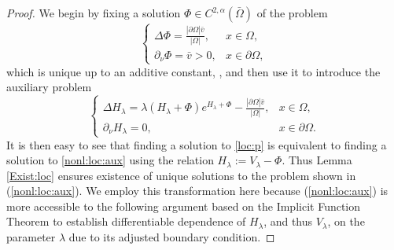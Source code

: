 \documentclass[12pt,a4paper]{amsart}
\theoremstyle{definition}
\theoremstyle{remark}
\numberwithin{equation}{section}
\numberwithin{theorem}{section}
\begin{document}
\begin{proof}
We begin by fixing a solution $\Phi \in C^{2,\alpha}(\bar{\Omega})$ of the problem
$$
\left\{\begin{array}{lr}
\Delta \Phi=\frac{|\partial\Omega|\bar{v}}{|\Omega|},& x\in\Omega,\\
\partial_\nu \Phi=\bar{v}>0,& x\in\partial\Omega, 
\end{array}\right.
$$
which is unique up to an additive constant, \cite{GNa}, and then use it to introduce the auxiliary problem 
\begin{equation}\label{nonl:loc:aux}
\left\{\begin{array}{lr}
\Delta H_\lambda= \lambda(H_\lambda+\Phi) e^{H_\lambda + \Phi}-\frac{|\partial\Omega|\bar{v}}{|\Omega|},& x\in\Omega,\\
\partial_\nu H_\lambda=0,& x\in\partial\Omega.
\end{array}\right.
\end{equation}
It is then easy to see that finding a solution to \eqref{loc:p} is equivalent to finding a solution to \eqref{nonl:loc:aux} using the relation $H_\lambda:=V_{\lambda}-\Phi$. Thus Lemma \ref{Exist:loc} ensures existence of unique solutions to the problem shown in (\ref{nonl:loc:aux}). We employ this transformation here because (\ref{nonl:loc:aux}) is more accessible to the following argument based on the Implicit Function Theorem to establish differentiable dependence of $H_\lambda$, and thus $V_\lambda$, on the parameter $\lambda$ due to its adjusted boundary condition.


\end{proof}
\end{document}
